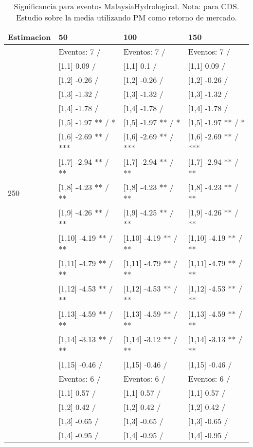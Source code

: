 \begin{table}

\caption{Significancia para eventos MalaysiaHydrological. Nota: para CDS. Estudio sobre la media utilizando PM como retorno de mercado.}
\centering
\begin{tabular}[t]{llll}
\toprule
Estimacion & 50 & 100 & 150\\
\midrule
 & Eventos:  7 / & Eventos:  7 / & Eventos:  7 /\\
 & {}[1,1] 0.09  / & {}[1,1] 0.1  / & {}[1,1] 0.09  /\\
 & {}[1,2] -0.26  / & {}[1,2] -0.26  / & {}[1,2] -0.26  /\\
 & {}[1,3] -1.32  / & {}[1,3] -1.32  / & {}[1,3] -1.32  /\\
 & {}[1,4] -1.78  / & {}[1,4] -1.78  / & {}[1,4] -1.78  /\\
\addlinespace
 & {}[1,5] -1.97 ** / * & {}[1,5] -1.97 ** / * & {}[1,5] -1.97 ** / *\\
 & {}[1,6] -2.69 ** / *** & {}[1,6] -2.69 ** / *** & {}[1,6] -2.69 ** / ***\\
 & {}[1,7] -2.94 ** / ** & {}[1,7] -2.94 ** / ** & {}[1,7] -2.94 ** / **\\
250 & {}[1,8] -4.23 ** / ** & {}[1,8] -4.23 ** / ** & {}[1,8] -4.23 ** / **\\
 & {}[1,9] -4.26 ** / ** & {}[1,9] -4.25 ** / ** & {}[1,9] -4.26 ** / **\\
\addlinespace
 & {}[1,10] -4.19 ** / ** & {}[1,10] -4.19 ** / ** & {}[1,10] -4.19 ** / **\\
 & {}[1,11] -4.79 ** / ** & {}[1,11] -4.79 ** / ** & {}[1,11] -4.79 ** / **\\
 & {}[1,12] -4.53 ** / ** & {}[1,12] -4.53 ** / ** & {}[1,12] -4.53 ** / **\\
 & {}[1,13] -4.59 ** / ** & {}[1,13] -4.59 ** / ** & {}[1,13] -4.59 ** / **\\
 & {}[1,14] -3.13 ** / ** & {}[1,14] -3.12 ** / ** & {}[1,14] -3.13 ** / **\\
\addlinespace
 & {}[1,15] -0.46  / & {}[1,15] -0.46  / & {}[1,15] -0.46  /\\
 & Eventos:  6 / & Eventos:  6 / & Eventos:  6 /\\
 & {}[1,1] 0.57  / & {}[1,1] 0.57  / & {}[1,1] 0.57  /\\
 & {}[1,2] 0.42  / & {}[1,2] 0.42  / & {}[1,2] 0.42  /\\
 & {}[1,3] -0.65  / & {}[1,3] -0.65  / & {}[1,3] -0.65  /\\
\addlinespace
 & {}[1,4] -0.95  / & {}[1,4] -0.95  / & {}[1,4] -0.95  /\\

\end{tabular}
\end{table}
